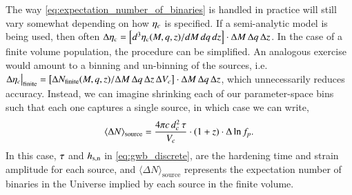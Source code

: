         The way \eqref{eq:expectation_number_of_binaries} is handled in practice will still vary somewhat depending on how $\eta_c$ is specified.  If a semi-analytic model is being used, then often
        $\Delta \eta_c = \left[ d^3 \eta_c(M,q,z) / dM \, dq \, dz \right] \cdot \Delta M \, \Delta q \, \Delta z$.  In the case of a finite volume population, the procedure can be simplified.  An analogous exercise would amount to a binning and un-binning of the sources, i.e.~$\Delta \eta_c \big|_\textrm{finite} = \left[ \Delta N_\textrm{finite}(M,q,z) / \Delta M \, \Delta q \, \Delta z \, \Delta V_c \right] \cdot \Delta M \, \Delta q \, \Delta z$, which unnecessarily reduces accuracy.  Instead, we can imagine shrinking each of our parameter-space bins such that each one captures a single source, in which case we can write,
        \begin{equation}
            \label{eq:expectation_number_of_single_binary}
            \langle \Delta N \rangle_\textrm{source} = \frac{4\pi c \, d_c^2 \, \tau}{V_c} \cdot (1+z) \cdot \Delta \ln f_p.
        \end{equation}
        In this case, $\tau$ and $h_{\textrm{s,n}}$ in \eqref{eq:gwb_discrete}, are the hardening time and strain amplitude for each source, and $\langle \Delta N \rangle_\textrm{source}$ represents the expectation number of binaries in the Universe implied by each source in the finite volume.


